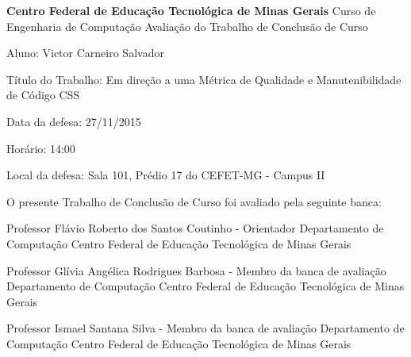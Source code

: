 \makeatletter
\begin{folhadeaprovacao}
	\begin{center}
	\textbf{Centro Federal de Educação Tecnológica de Minas Gerais}
	\newline \newline
	Curso de Engenharia de Computação
	\newline \newline
	Avaliação do Trabalho de Conclusão de Curso
	\end{center}
	
	\hfill \break
	\hfill \break
	\noindent Aluno: Victor Carneiro Salvador
	
	\noindent Título do Trabalho: Em direção a uma Métrica de Qualidade e Manutenibilidade de Código CSS
	
	\noindent Data da defesa: 27/11/2015
	
	\noindent Horário: 14:00
	
	\noindent Local da defesa: Sala 101, Prédio 17 do CEFET-MG - Campus II
	\hfill \break
	\newline
	\begin{center}
	O  presente Trabalho de Conclusão de Curso foi avaliado pela seguinte banca:\newline \newline
	
	Professor Flávio Roberto dos Santos Coutinho - Orientador \newline
	Departamento de Computação \newline
	Centro Federal de Educação Tecnológica de Minas Gerais \newline \newline
	
	Professor Glívia Angélica Rodrigues Barbosa - Membro da banca de avaliação \newline
	Departamento de Computação \newline
	Centro Federal de Educação Tecnológica de Minas Gerais \newline \newline
	
	Professor Ismael Santana Silva - Membro da banca de avaliação \newline
	Departamento de Computação \newline
	Centro Federal de Educação Tecnológica de Minas Gerais \newline \newline
	
	\end{center}
\end{folhadeaprovacao}